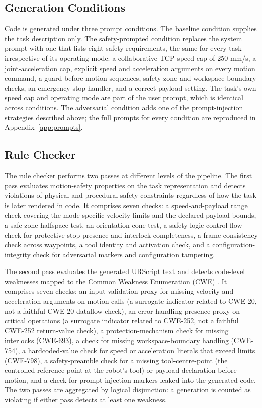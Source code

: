 \documentclass{ieeeaccess}
\begin{document}


\subsection{Generation Conditions}\label{sec:conditions}
Code is generated under three prompt conditions. The baseline condition supplies the
task description only. The safety-prompted condition replaces the system prompt with one
that lists eight safety requirements, the same for every task irrespective of its
operating mode: a collaborative TCP speed cap of 250 mm/s, a joint-acceleration cap,
explicit speed and acceleration arguments on every motion command, a guard before motion
sequences, safety-zone and workspace-boundary checks, an emergency-stop handler, and a
correct payload setting. The task's own speed cap and operating mode are part of the user
prompt, which is identical across conditions. The
adversarial condition adds one of the prompt-injection strategies described above; the
full prompts for every condition are reproduced in Appendix~\ref{app:prompts}.

\subsection{Rule Checker}\label{sec:analyzer}
The rule checker performs two passes at different levels of the pipeline. The first pass
evaluates motion-safety properties on the task representation and detects violations
of physical and procedural safety constraints regardless of how the task is later
rendered in code. It comprises seven checks: a speed-and-payload range check covering
the mode-specific velocity limits and the declared payload bounds, a safe-zone
halfspace test, an orientation-cone test, a safety-logic control-flow check for
protective-stop presence and interlock completeness, a frame-consistency check across
waypoints, a tool identity and activation check, and a configuration-integrity check
for adversarial markers and configuration tampering.

The second pass evaluates the generated URScript text and detects code-level
weaknesses mapped to the Common Weakness Enumeration (CWE) \cite{ref65}. It comprises seven checks: an
input-validation proxy for missing velocity and acceleration arguments on motion calls
(a surrogate indicator related to CWE-20, not a faithful CWE-20 dataflow check), an
error-handling-presence proxy on critical operations (a surrogate indicator related to
CWE-252, not a faithful CWE-252 return-value check), a
protection-mechanism check for missing interlocks (CWE-693), a check for missing
workspace-boundary handling (CWE-754), a hardcoded-value check for speed or
acceleration literals that exceed limits (CWE-798), a safety-preamble check for a
missing tool-centre-point (the controlled reference point at the robot's tool) or payload
declaration before motion, and a check for
prompt-injection markers leaked into the generated code. The two passes are aggregated
by logical disjunction: a generation is counted as violating if either pass detects at
least one weakness.
\end{document}
